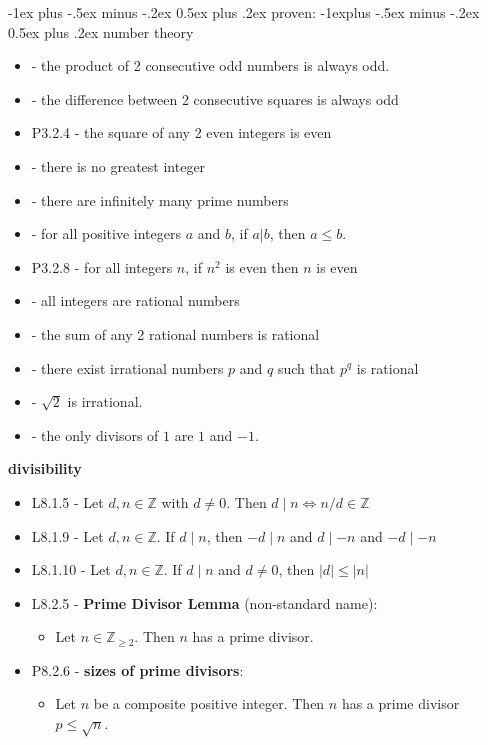 \documentclass[10pt, landscape]{article}
\makeatletter
\renewcommand{\section}{\@startsection{section}{1}{0mm}%
                                {-1ex plus -.5ex minus -.2ex}%
                                {0.5ex plus .2ex}%
                                {\normalfont\large\bfseries}}
\renewcommand{\subsection}{\@startsection{subsection}{2}{0mm}%
                                {-1explus -.5ex minus -.2ex}%
                                {0.5ex plus .2ex}%
                                {\normalfont\normalsize\bfseries}}
\renewcommand{\bf}[1]{\textbf{#1}}
\let\Iff\Leftrightarrow
\makeatother
\begin{document}
\begin{multicols}{3}
    \section{proven:}
    \subsection{number theory}
    \begin{itemize}
        \item - the product of 2 consecutive odd numbers is always odd.
        \item - the difference between 2 consecutive squares is always odd
        \item P3.2.4 -  the square of any 2 even integers is even
        \item - there is no greatest integer
        \item - there are infinitely many prime numbers
        \item - for all positive integers $a$ and $b$, if $a \vert b$, then $a \leq b$.
        \item P3.2.8 - for all integers $n$, if $n^2$ is even then $n$ is even
        \item - all integers are rational numbers
        \item - the sum of any 2 rational numbers is rational
        \item - there exist irrational numbers $p$ and $q$ such that $p^q$ is rational
        \item - $\sqrt{2}$ is irrational.
        \item - the only divisors of $1$ are $1$ and $-1$.
    \end{itemize}
    \textbf{divisibility}
    \begin{itemize}
        \item L8.1.5 - Let $d, n \in \mathbb{Z}$ with $d \neq 0$. Then $d \mid n \Iff n/d \in \mathbb{Z}$ 
        \item L8.1.9 - Let $d, n \in \mathbb{Z}$. If $d \mid n$, then $-d \mid n$ and $d \mid -n$ and $-d \mid -n$ 
        \item L8.1.10 - Let $d, n \in \mathbb{Z}$. If $d \mid n$ and $d \neq 0$, then $\vert d \vert \leq \vert n \vert$ 
        \item L8.2.5 - \bf{Prime Divisor Lemma} (non-standard name):
        \begin{itemize}
            \item Let $n \in \mathbb{Z}_{\geq 2}$. Then $n$ has a prime divisor.
        \end{itemize}
        \item P8.2.6 - \bf{sizes of prime divisors}: 
        \begin{itemize}
            \item Let $n$ be a composite positive integer. Then $n$ has a prime divisor $p \leq \sqrt{n}$.
        \end{itemize}
    \end{itemize}


\end{multicols}
\end{document}
